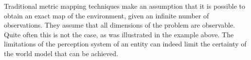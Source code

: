 Traditional metric mapping techniques make an assumption that it is
possible to obtain an exact map of the environment, given an infinite
number of observations. They assume that all dimensions of the problem
are observable. Quite often this is not the case, as was illustrated in
the example above. The limitations of the perception system of an entity
can indeed limit the certainty of the world model that can be achieved.

%
%




